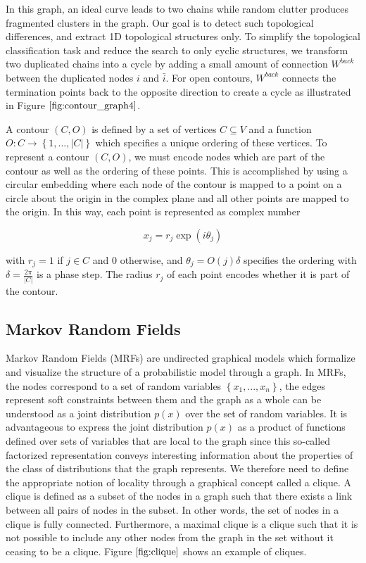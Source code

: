 \documentclass{SMBV12}
\begin{document}
In this graph, an ideal curve leads to two chains while random clutter produces fragmented clusters in the graph. Our goal is to detect such topological differences, and extract 1D topological structures only. To simplify the topological classification task and reduce the search to only cyclic structures, we transform two duplicated chains into a cycle by adding a small amount of connection $W^{back}$ between the duplicated nodes $i$ and $\bar{i}$. For open contours, $W^{back}$ connects the termination points back to the opposite direction to create a cycle as illustrated in Figure $\ref{fig:contour_graph4}$.

A contour $(C, O)$ is defined by a set of vertices $C \subseteq V$ and a function $O: C \rightarrow \left\lbrace 1, ..., \lvert C \rvert \right\rbrace$ which specifies a unique ordering of these vertices. To represent a contour $(C, O)$, we must encode nodes which are part of the contour as well as the ordering
of these points. This is accomplished by using a circular embedding where each node of the contour is mapped to a point on a circle about the origin in the complex plane and all other points are mapped to the origin. In this way, each point is represented as complex number

\begin{equation}
x_j = r_j \exp(i \theta_j)
\end{equation}

with $r_j = 1$ if $j \in C$ and $0$ otherwise, and $\theta_j = O(j) \delta$ specifies the ordering with $\delta = \frac{2\pi}{\lvert C \rvert}$ is a phase step. The radius $r_j$ of each point encodes whether it is part of the contour.

\subsection{Markov Random Fields}

Markov Random Fields (MRFs) are undirected graphical models which formalize and visualize the structure of a probabilistic model through a graph. In MRFs, the nodes correspond to a set of random variables $\left\lbrace x_1, ..., x_n\right\rbrace $, the edges represent soft constraints between them and the graph as a whole can be understood as a joint distribution $p(x)$ over the set of random variables. It is advantageous to express the joint distribution $p(x)$ as a product of functions defined over sets of variables that are local to the graph since this so-called factorized representation conveys interesting information about the properties of the class of distributions that the graph represents. We therefore need to define the appropriate notion of locality through a graphical concept called a clique. A clique is defined as a subset of the nodes in a graph such that there exists a link between all pairs of nodes in the subset. In other words, the set of nodes in a clique is fully connected. Furthermore, a maximal clique is a clique such that it is not possible to include any
other nodes from the graph in the set without it ceasing to be a clique. Figure $\ref{fig:clique}$ shows an example of cliques.
\end{document}
